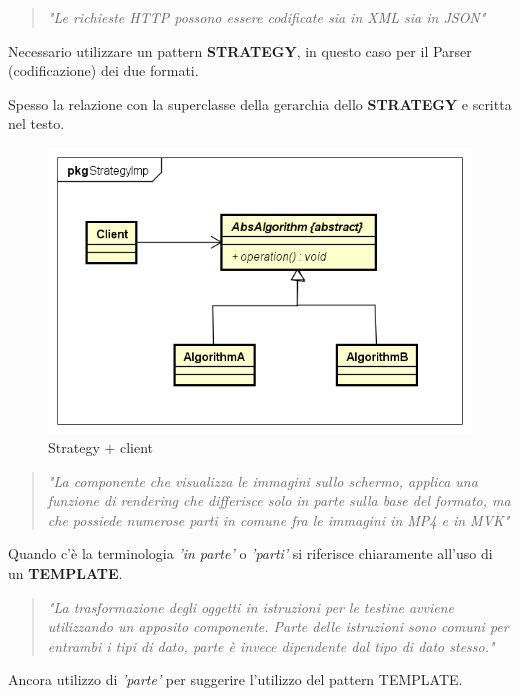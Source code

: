 \documentclass[a4paper,11pt]{article}
\begin{document}
	\begin{quote}
		\textit{"Le richieste HTTP possono essere codificate sia in XML sia in JSON"}
	\end{quote}
	Necessario utilizzare un pattern \textbf{STRATEGY}, in questo caso per il Parser (codificazione) dei due formati.
	
	Spesso la relazione con la superclasse della gerarchia dello \textbf{STRATEGY} e scritta nel testo.
	
			\begin{figure} [h]
					\centering
					\includegraphics[scale=0.6]{classDiagramPattern/StrategyImp/StrategyImp}
					\caption{Strategy + client}
					\label{fig:StrategyImp}
			\end{figure}
	
	\begin{quote}
		\textit{"La componente che visualizza le immagini sullo schermo, applica una funzione di rendering che differisce solo in parte sulla base del formato, ma che possiede numerose parti in comune fra le immagini in MP4 e in MVK"}
	\end{quote}
	
	Quando c'è la terminologia \textit{'in parte'} o \textit{'parti'} si riferisce chiaramente all'uso di un \textbf{TEMPLATE}. 
	
	\begin{quote}
		\textit{"La trasformazione degli oggetti in istruzioni per le testine avviene utilizzando un apposito componente. Parte delle istruzioni sono comuni per entrambi i tipi di dato, parte è invece dipendente dal tipo di dato stesso."}
	\end{quote}
	
	Ancora utilizzo di \textit{'parte'} per suggerire l'utilizzo del pattern TEMPLATE.
	
\end{document}
